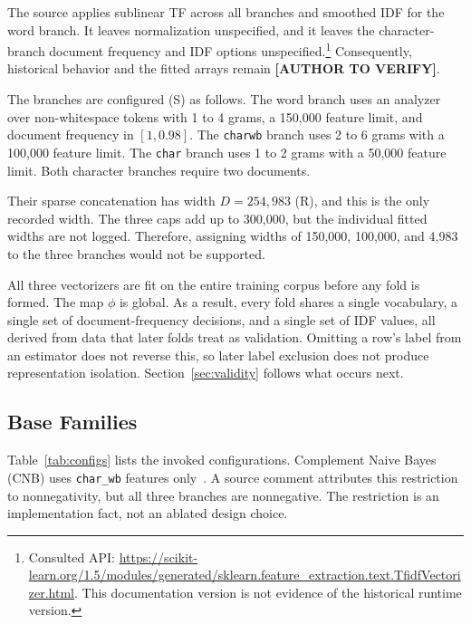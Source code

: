\documentclass[runningheads]{llncs}
\newcommand{\verifyauthor}{\textbf{[AUTHOR TO VERIFY]}}
\begin{document}
The source applies sublinear TF across all branches and smoothed IDF for the word branch. It leaves normalization unspecified, and it leaves the character-branch document frequency and IDF options unspecified.\footnote{Consulted API: \url{https://scikit-learn.org/1.5/modules/generated/sklearn.feature_extraction.text.TfidfVectorizer.html}. This documentation version is not evidence of the historical runtime version.} Consequently, historical behavior and the fitted arrays remain \verifyauthor{}.

The branches are configured (S) as follows. The word branch uses an analyzer over non-whitespace tokens with 1 to 4 grams, a 150,000 feature limit, and document frequency in $[1, 0.98]$. The \texttt{charwb} branch uses 2 to 6 grams with a 100,000 feature limit. The \texttt{char} branch uses 1 to 2 grams with a 50,000 feature limit. Both character branches require two documents.

Their sparse concatenation has width $D = 254{,}983$ (R), and this is the only recorded width. The three caps add up to 300,000, but the individual fitted widths are not logged. Therefore, assigning widths of 150,000, 100,000, and 4,983 to the three branches would not be supported.

All three vectorizers are fit on the entire training corpus before any fold is formed. The map $\phi$ is global. As a result, every fold shares a single vocabulary, a single set of document-frequency decisions, and a single set of IDF values, all derived from data that later folds treat as validation. Omitting a row’s label from an estimator does not reverse this, so later label exclusion does not produce representation isolation. Section~\ref{sec:validity} follows what occurs next.

\subsection{Base Families}

Table~\ref{tab:configs} lists the invoked configurations. Complement Naive Bayes (CNB) uses \texttt{char\_wb} features only~\cite{rennie2003tackling}. A source comment attributes this restriction to nonnegativity, but all three branches are nonnegative. The restriction is an implementation fact, not an ablated design choice.
\end{document}
